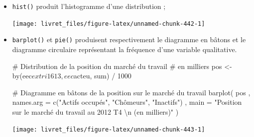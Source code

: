 \documentclass[12pt,twosided, notitlepage]{book}
\newenvironment{Shaded}{}{}
\newcommand{\KeywordTok}[1]{\textcolor[rgb]{0.00,0.00,1.00}{#1}}
\newcommand{\DataTypeTok}[1]{#1}
\newcommand{\DecValTok}[1]{#1}
\newcommand{\CharTok}[1]{\textcolor[rgb]{0.00,0.50,0.50}{#1}}
\newcommand{\StringTok}[1]{\textcolor[rgb]{0.00,0.50,0.50}{#1}}
\newcommand{\CommentTok}[1]{\textcolor[rgb]{0.00,0.50,0.00}{#1}}
\newcommand{\OperatorTok}[1]{#1}
\newcommand{\NormalTok}[1]{#1}
\renewenvironment{Shaded}{\begin{snugshade}}{\end{snugshade}}
\begin{document}
\begin{itemize}
\item
  \texttt{hist()} produit l'histogramme
  d'une distribution ;

\begin{Shaded}
\end{Shaded}

  \begin{center}\texttt{[image: livret\_files/figure-latex/unnamed-chunk-442-1]} \end{center}
\item
  \texttt{barplot()} et
  \texttt{pie()} produisent respectivement le
  diagramme en bâtons et le diagramme circulaire représentant la
  fréquence d'une variable qualitative.

\begin{Shaded}
\begin{Highlighting}[]
\CommentTok{# Distribution de la position du marché du travail}
\CommentTok{# en milliers}
\NormalTok{pos <-}\StringTok{ }\KeywordTok{by}\NormalTok{(eec}\OperatorTok{$}\NormalTok{extri1613, eec}\OperatorTok{$}\NormalTok{acteu, sum) }\OperatorTok{/}\StringTok{ }\DecValTok{1000}

\CommentTok{# Diagramme en bâtons de la position sur le marché du travail}
\KeywordTok{barplot}\NormalTok{(}
\NormalTok{  pos}
\NormalTok{  , }\DataTypeTok{names.arg =} \KeywordTok{c}\NormalTok{(}\StringTok{"Actifs occupés"}\NormalTok{, }\StringTok{"Chômeurs"}\NormalTok{, }\StringTok{"Inactifs"}\NormalTok{)}
\NormalTok{  , }\DataTypeTok{main =} \StringTok{"Position sur le marché du travail au 2012 T4 }\CharTok{\textbackslash{}n}\StringTok{ (en milliers)"}
\NormalTok{)}
\end{Highlighting}
\end{Shaded}

  \begin{center}\texttt{[image: livret\_files/figure-latex/unnamed-chunk-443-1]} \end{center}


\end{itemize}
\end{document}
